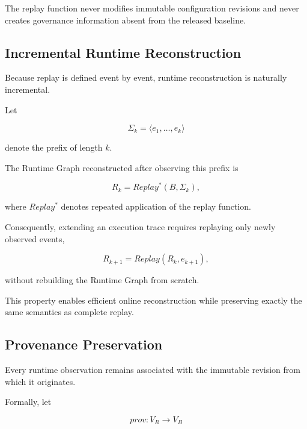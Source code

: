 \documentclass[10pt]{article}
\begin{document}
The replay function never modifies immutable configuration revisions and never
creates governance information absent from the released baseline.

\subsection{Incremental Runtime Reconstruction}
\label{appendix:incremental_runtime_reconstruction}

Because replay is defined event by event, runtime reconstruction is naturally
incremental.

Let

\begin{equation}
\Sigma_k
=
\langle
e_1,\ldots,e_k
\rangle
\end{equation}

denote the prefix of length $k$.

The Runtime Graph reconstructed after observing this prefix is

\begin{equation}
R_k
=
Replay^*
(
B,
\Sigma_k
),
\end{equation}

where $Replay^*$ denotes repeated application of the replay function.

Consequently, extending an execution trace requires replaying only newly
observed events,

\begin{equation}
R_{k+1}
=
Replay(R_k,e_{k+1}),
\end{equation}

without rebuilding the Runtime Graph from scratch.

This property enables efficient online reconstruction while preserving exactly
the same semantics as complete replay.

\subsection{Provenance Preservation}
\label{appendix:runtime_provenance}

Every runtime observation remains associated with the immutable revision from
which it originates.

Formally, let

\begin{equation}
prov
:
V_R
\rightarrow
V_B
\end{equation}
\end{document}
